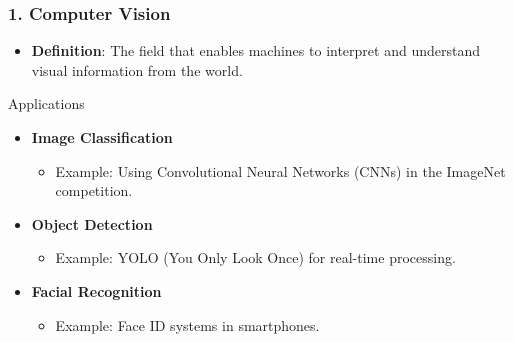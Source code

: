 \documentclass{beamer}
\begin{document}
\begin{frame}[fragile]
    \frametitle{1. Computer Vision}
    \begin{itemize}
        \item \textbf{Definition}: The field that enables machines to interpret and understand visual information from the world.
    \end{itemize}
    \begin{block}{Applications}
        \begin{itemize}
            \item \textbf{Image Classification}
                \begin{itemize}
                    \item Example: Using Convolutional Neural Networks (CNNs) in the ImageNet competition.
                \end{itemize}
            \item \textbf{Object Detection} 
                \begin{itemize}
                    \item Example: YOLO (You Only Look Once) for real-time processing.
                \end{itemize}
            \item \textbf{Facial Recognition}
                \begin{itemize}
                    \item Example: Face ID systems in smartphones.
                \end{itemize}
        \end{itemize}
    \end{block}
\end{frame}
\end{document}

